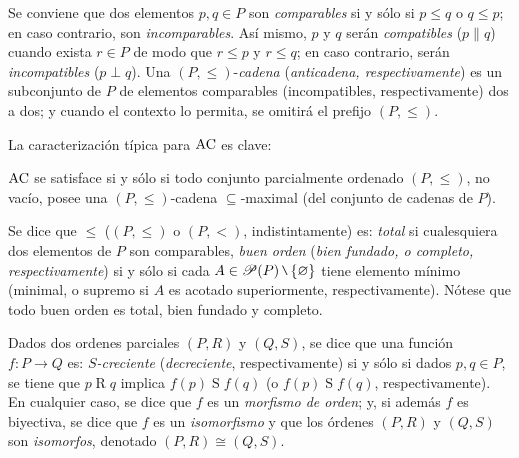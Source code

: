     Se conviene que dos elementos $p,q \in P$ son \textit{comparables} si y sólo si $p \leq q$ o $q \leq p$; en caso contrario, son \textit{incomparables}. Así mismo, $p$ y $q$ serán \textit{compatibles} ($p \parallel q$) cuando exista $r \in P$ de modo que $r \leq p$ y $r \leq q$; en caso contrario, serán \textit{incompatibles} ($p \perp q$). Una $(P,\leq)$-\textit{cadena} (\textit{anticadena, respectivamente}) es un subconjunto de $P$ de elementos comparables (incompatibles, respectivamente) dos a dos; y cuando el contexto lo permita, se omitirá el prefijo $(P,\leq)$.

    La caracterización típica para $\operatorname{AC}$ es clave:

    \begin{teorema}\label{teo-PMH}
        $\operatorname{AC}$ se satisface si y sólo si todo conjunto parcialmente ordenado $(P, \leq)$, no vacío, posee una $(P,\leq)$-cadena $\subseteq$-maximal (del conjunto de cadenas de $P$).
    \end{teorema}

    Se dice que $\leq$ ($(P,\leq)$ o $(P,<)$, indistintamente) es: \textit{total} si cualesquiera dos elementos de $P$ son comparables, \textit{buen orden} (\textit{bien fundado, o completo, respectivamente}) si y sólo si cada $A \in \ms{P}(P) \setminus \{\emptyset\}$ tiene elemento mínimo (minimal, o supremo si $A$ es acotado superiormente, respectivamente). Nótese que todo buen orden es total, bien fundado y completo.

    Dados dos ordenes parciales $(P,R)$ y $(Q,S)$, se dice que una función $f:P \to Q$ es: \textit{$S$-creciente} (\textit{decreciente}, respectivamente) si y sólo si dados $p,q \in P$, se tiene que $p \mathrel{R} q$ implica $f(p) \mathrel{S} f(q)$ (o $f(p) \mathrel{S} f(q)$, respectivamente). En cualquier caso, se dice que $f$ es un \textit{morfismo de orden}; y, si además $f$ es biyectiva, se dice que $f$ es un \textit{isomorfismo} y que los órdenes $(P,R)$ y $(Q,S)$ son \textit{isomorfos}, denotado $(P,R) \cong (Q,S)$.

